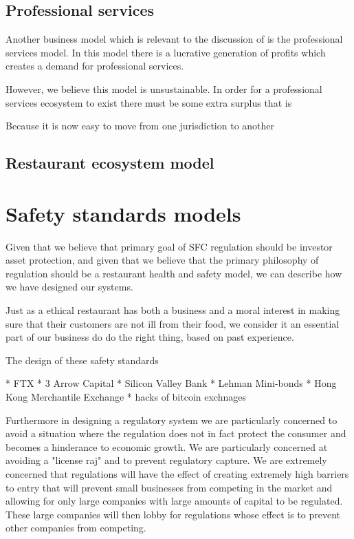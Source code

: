 \subsection{Professional services}

Another business model which is relevant to the discussion of is the
professional services model.  In this model there is a lucrative
generation of profits which creates a demand for professional
services.

However, we believe this model is unsustainable.  In order for a
professional services ecosystem to exist there must be some extra
surplus that is

Because it is now easy to move from one jurisdiction to another

\subsection{Restaurant ecosystem model}

\section{Safety standards models}

Given that we believe that primary goal of SFC regulation should be
investor asset protection, and given that we believe that the primary
philosophy of regulation should be a restaurant health and safety
model, we can describe how we have designed our systems.

Just as a ethical restaurant has both a business and a moral interest
in making sure that their customers are not ill from their food, we
consider it an essential part of our business do do the right thing,
based on past experience.

The design of these safety standards

* FTX
* 3 Arrow Capital
* Silicon Valley Bank
* Lehman Mini-bonds
* Hong Kong Merchantile Exchange
* hacks of bitcoin exchnages

Furthermore in designing a regulatory system we are particularly
concerned to avoid a situation where the regulation does not in fact
protect the consumer and becomes a hinderance to economic growth.  We
are particularly concerned at avoiding a "license raj" and to prevent
regulatory capture.  We are extremely concerned that regulations will
have the effect of creating extremely high barriers to entry that will
prevent small businesses from competing in the market and allowing for
only large companies with large amounts of capital to be regulated.
These large companies will then lobby for regulations whose effect is
to prevent other companies from competing.

